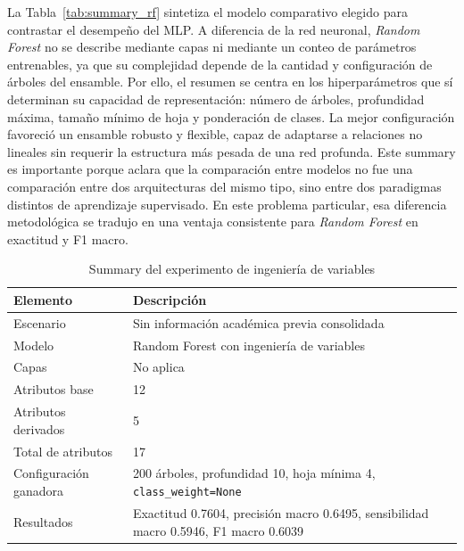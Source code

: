 \documentclass[conference]{IEEEtran}
\begin{document}
La Tabla~\ref{tab:summary_rf} sintetiza el modelo comparativo elegido para contrastar el desempeño del MLP. A diferencia de la red neuronal, \textit{Random Forest} no se describe mediante capas ni mediante un conteo de parámetros entrenables, ya que su complejidad depende de la cantidad y configuración de árboles del ensamble. Por ello, el resumen se centra en los hiperparámetros que sí determinan su capacidad de representación: número de árboles, profundidad máxima, tamaño mínimo de hoja y ponderación de clases. La mejor configuración favoreció un ensamble robusto y flexible, capaz de adaptarse a relaciones no lineales sin requerir la estructura más pesada de una red profunda. Este summary es importante porque aclara que la comparación entre modelos no fue una comparación entre dos arquitecturas del mismo tipo, sino entre dos paradigmas distintos de aprendizaje supervisado. En este problema particular, esa diferencia metodológica se tradujo en una ventaja consistente para \textit{Random Forest} en exactitud y F1 macro.

\begin{table}[htbp]
\centering
\caption{Summary del experimento de ingeniería de variables}
\scriptsize
\setlength{\tabcolsep}{4pt}
\begin{tabular}{p{3.0cm}p{4.2cm}}
\toprule
Elemento & Descripción \\
\midrule
Escenario & Sin información académica previa consolidada \\
Modelo & Random Forest con ingeniería de variables \\
Capas & No aplica \\
Atributos base & 12 \\
Atributos derivados & 5 \\
Total de atributos & 17 \\
Configuración ganadora & 200 árboles, profundidad 10, hoja mínima 4, \texttt{class\_weight=None} \\
Resultados & Exactitud 0.7604, precisión macro 0.6495, sensibilidad macro 0.5946, F1 macro 0.6039 \\
\bottomrule
\end{tabular}
\normalsize
\label{tab:summary_ingenieria}
\end{table}
\end{document}
